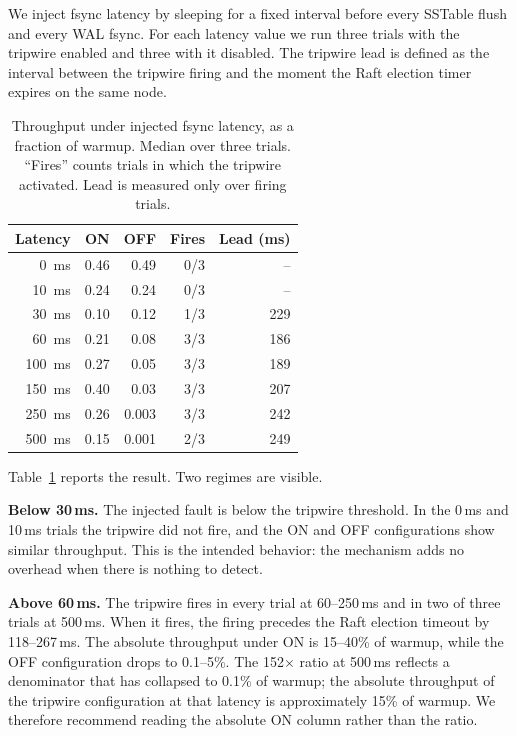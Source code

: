 \documentclass[conference, a4paper]{IEEEtran}
\begin{document}
We inject fsync latency by sleeping for a fixed interval before every
SSTable flush and every WAL fsync. For each latency value we run three
trials with the tripwire enabled and three with it disabled. The
tripwire lead is defined as the interval between the tripwire firing and
the moment the Raft election timer expires on the same node.

\begin{table}[t]
\centering
\caption{Throughput under injected fsync latency, as a fraction of
warmup. Median over three trials. ``Fires'' counts trials in which the
tripwire activated. Lead is measured only over firing trials.}
\label{tab:tripwire}
\small
\begin{tabular}{r r r r r}
\toprule
\textbf{Latency} & \textbf{ON} & \textbf{OFF} & \textbf{Fires} & \textbf{Lead (ms)} \\
\midrule
0~ms   & 0.46 & 0.49 & 0/3 & -- \\
10~ms  & 0.24 & 0.24 & 0/3 & -- \\
30~ms  & 0.10 & 0.12 & 1/3 & 229 \\
60~ms  & 0.21 & 0.08 & 3/3 & 186 \\
100~ms & 0.27 & 0.05 & 3/3 & 189 \\
150~ms & 0.40 & 0.03 & 3/3 & 207 \\
250~ms & 0.26 & 0.003 & 3/3 & 242 \\
500~ms & 0.15 & 0.001 & 2/3 & 249 \\
\bottomrule
\end{tabular}
\end{table}

Table~\ref{tab:tripwire} reports the result. Two regimes are visible.

\textbf{Below 30\,ms.} The injected fault is below the tripwire
threshold. In the 0\,ms and 10\,ms trials the tripwire did not fire, and
the ON and OFF configurations show similar throughput. This is the
intended behavior: the mechanism adds no overhead when there is nothing
to detect.

\textbf{Above 60\,ms.} The tripwire fires in every trial at 60--250\,ms
and in two of three trials at 500\,ms. When it fires, the firing
precedes the Raft election timeout by 118--267\,ms. The absolute
throughput under ON is 15--40\% of warmup, while the OFF configuration
drops to 0.1--5\%. The 152$\times$ ratio at 500\,ms reflects a
denominator that has collapsed to 0.1\% of warmup; the absolute
throughput of the tripwire configuration at that latency is
approximately 15\% of warmup. We therefore recommend reading the
absolute ON column rather than the ratio.
\end{document}
